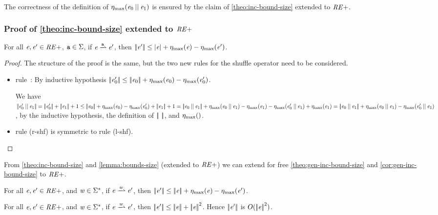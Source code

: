 The correctness of the definition of ${\eta_{\max}}({\mathit {e}_0\mathbin{||}\mathit {e}_1})$ is ensured by the claim of \cref{theo:inc-bound-size} extended to $\mathit {RE+}$.

\subsubsection*{Proof of \cref{theo:inc-bound-size} extended to $\mathit {RE+}$
}
For all $\mathit {e},\mathit {e}'\in\mathit {RE+}$, $\mathtt {a}\in\Sigma$, if $\re\parDer{\sym}\re'$, then ${{\mid\!\mid}}{\mathit {e}'}{{\mid\!\mid}}\leq {\mid}{\ensuremath{\mathit {e}}}{\mid}+{\eta_{\max}}({\mathit {e}})-{\eta_{\max}}({\mathit {e}'})$.

\begin{proof}
 The structure of the proof is the same, but the two new rules for the shuffle operator need to be considered.
 \begin{itemize}
  \item %
        rule~: By inductive hypothesis ${{\mid\!\mid}}{\mathit {e}_0'}{{\mid\!\mid}}\leq {{\mid\!\mid}}{\ensuremath{\mathit {e}}_0}{{\mid\!\mid}}+{\eta_{\max}}({\mathit {e}_0})-{\eta_{\max}}({\mathit {e}_0'})$.

        We have $\tsize{\re'_0\shuffleop\re_1}=\tsize{\re_0'}+\tsize{\re_1}+1\leq\tsize{\re_0}+\incFunSize{\re_0}-\incFunSize{\re_0'}+\tsize{\re_1}+1=\tsize{\re_0\shuffleop\re_1}+\incFunSize{\re_0\shuffleop\re_1}-\incFunSize{\re_1}-\incFunSize{\re_0'\shuffleop\re_1}+\incFunSize{\re_1}=\tsize{\re_0\shuffleop\re_1}+\incFunSize{\re_0\shuffleop\re_1}-\incFunSize{\re_0'\shuffleop\re_1}$, by the inductive hypothesis, the definition of ${{\mid\!\mid}}{\ }{{\mid\!\mid}}$, and ${\eta_{\max}}({})$.
  \item rule (r-shf) is symmetric to rule (l-shf).
 \end{itemize}
\end{proof}

From \cref{theo:inc-bound-size} and \cref{lemma:bounds-size} (extended to $\mathit {RE+}$) we can
extend for free \cref{theo:gen-inc-bound-size} and \cref{cor:gen-inc-bound-size}  to $\mathit {RE+}$.

\begin{theorem}
 For all $\mathit {e},\mathit {e}'\in\mathit {RE+}$, and $\mathit {w}\in\Sigma^*$, if $\re\parDer{\word}\re'$, then ${{\mid\!\mid}}{\mathit {e}'}{{\mid\!\mid}}\leq{{\mid\!\mid}}{\ensuremath{\mathit {e}}}{{\mid\!\mid}}+{\eta_{\max}}({\mathit {e}})-{\eta_{\max}}({\mathit {e}'})$.
\end{theorem}

\begin{corollary}
 For all $\mathit {e},\mathit {e}'\in\mathit {RE+}$, and $\mathit {w}\in\Sigma^*$, if $\re\parDer{\word}\re'$, then ${{\mid\!\mid}}{\mathit {e}'}{{\mid\!\mid}}\leq{{\mid\!\mid}}{\ensuremath{\mathit {e}}}{{\mid\!\mid}}+{{\mid\!\mid}}{\mathit {e}}{{\mid\!\mid}}^2$. Hence ${{\mid\!\mid}}{\mathit {e}'}{{\mid\!\mid}}$ is $O({{\mid\!\mid}}{\mathit {e}}{{\mid\!\mid}}^2)$.
\end{corollary}